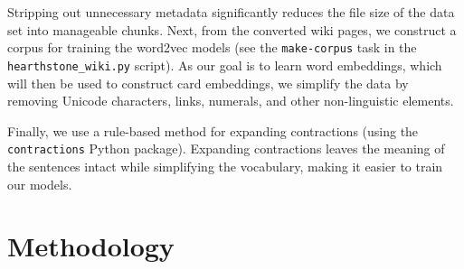 \documentclass{paper}
\begin{document}

Stripping out unnecessary metadata significantly reduces the file size of the data set into manageable chunks. Next, from the converted wiki pages, we construct a corpus for training the word2vec models \cite{goldberg2014word2vec} (see the \texttt{make-corpus} task in the \texttt{hearthstone\_wiki.py} script). As our goal is to learn word embeddings, which will then be used to construct card embeddings, we simplify the data by removing Unicode characters, links, numerals, and other non-linguistic elements. 

Finally, we use a rule-based method for expanding contractions (using the \texttt{contractions} Python package). Expanding contractions leaves the meaning of the sentences intact while simplifying the vocabulary, making it easier to train our models.

\section{Methodology}
\end{document}
